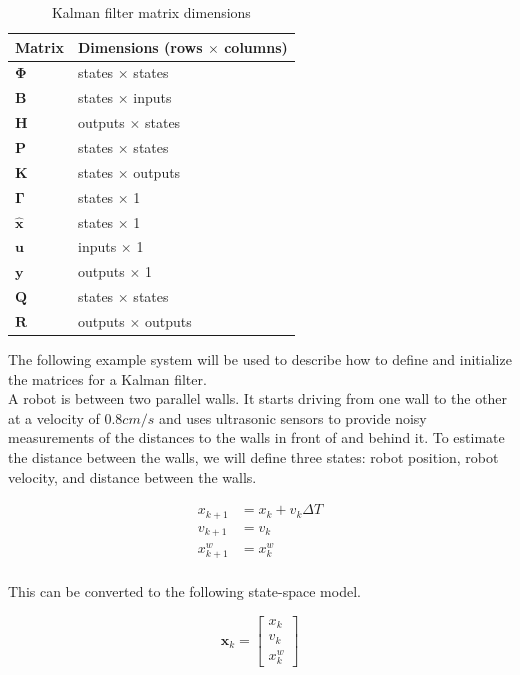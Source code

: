 \documentclass[10pt,conference,compsoc]{IEEEtran}
\newcommand{\mtx}[1] {\bm #1}
\begin{document}
\begin{table}[ht]
  \caption{Kalman filter matrix dimensions}
  \renewcommand{\arraystretch}{1.5}
  \centering
  \begin{tabular}{|ll|}
    \hline
    \textbf{Matrix} & \textbf{Dimensions (rows $\times$ columns)} \\
    \hline
    $\mtx{\Phi}$ & states $\times$ states \\
    $\mtx{B}$ & states $\times$ inputs \\
    $\mtx{H}$ & outputs $\times$ states \\
    $\mtx{P}$ & states $\times$ states \\
    $\mtx{K}$ & states $\times$ outputs \\
    $\mtx{\Gamma}$ & states $\times$ 1 \\
    $\mtx{\hat{x}}$ & states $\times$ 1 \\
    $\mtx{u}$ & inputs $\times$ 1 \\
    $\mtx{y}$ & outputs $\times$ 1 \\
    $\mtx{Q}$ & states $\times$ states \\
    $\mtx{R}$ & outputs $\times$ outputs \\
    \hline
  \end{tabular}
  \label{tab:kf_matrix_dims}
\end{table}

The following example system will be used to describe how to define and
initialize the matrices for a Kalman filter. \\

A robot is between two parallel walls. It starts driving from one wall to the
other at a velocity of $0.8 cm/s$ and uses ultrasonic sensors to provide noisy
measurements of the distances to the walls in front of and behind it. To
estimate the distance between the walls, we will define three states: robot
position, robot velocity, and distance between the walls.

\begin{align}
  x_{k+1} &= x_k + v_k \Delta T \\
  v_{k+1} &= v_k \\
  x_{k+1}^w &= x_k^w
\end{align}
\\
This can be converted to the following state-space model.

\begin{equation}
  \mtx{x}_k = \left[
  \begin{array}{c}
    x_k \\
    v_k \\
    x_k^w
  \end{array} \right]
\end{equation}
\end{document}
